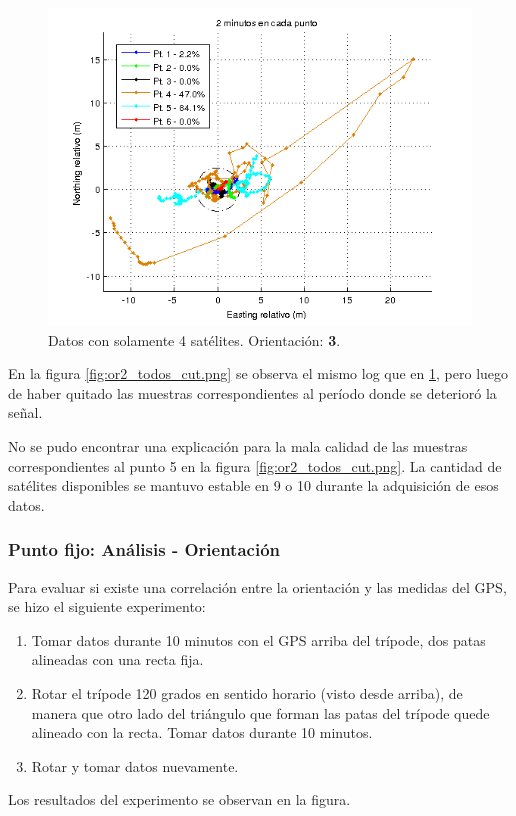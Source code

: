 \documentclass[main]{subfiles}
\begin{document}
\begin{figure}
  \includegraphics[width=.6\textwidth]{./pics_gps/or2_todos_sat_mal.png}
  \caption{Datos con solamente 4 satélites. Orientación: \textbf{3}.}
  \label{fig:or2_todos_sat_mal.png}
\vspace{-60pt}
\end{figure}

En la figura \ref{fig:or2_todos_cut.png} se observa el mismo log que en \ref{fig:or2_todos_sat_mal.png}, pero luego de haber quitado las muestras correspondientes al período donde se deterioró la señal.

No se pudo encontrar una explicación para la mala calidad de las muestras correspondientes al punto 5 en la figura \ref{fig:or2_todos_cut.png}. La cantidad de satélites disponibles se mantuvo estable en 9 o 10 durante la adquisición de esos datos.

\subsubsection{Punto fijo: Análisis - \textbf{Orientación}}
\label{sec:gps-orientacion}

Para evaluar si existe una correlación entre la orientación y las medidas del GPS, se hizo el siguiente experimento:
\begin{enumerate}
\item Tomar datos durante 10 minutos con el GPS arriba del trípode, dos patas alineadas con una recta fija.
\item Rotar el trípode 120 grados en sentido horario (visto desde arriba), de manera que otro lado del triángulo que forman las patas del trípode quede alineado con la recta. Tomar datos durante 10 minutos.
\item Rotar y tomar datos nuevamente.
\end{enumerate}

Los resultados del experimento se observan en la figura.
\end{document}
